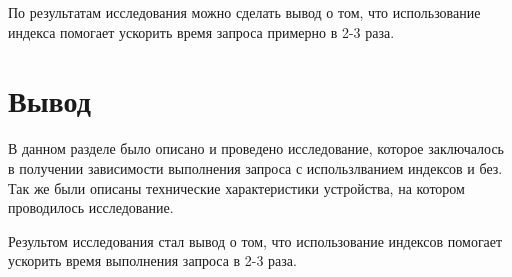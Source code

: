 По результатам исследования можно сделать вывод 
о том, что использование индекса помогает ускорить
время запроса примерно в 2-3 раза.

\section*{Вывод}

В данном разделе было описано и проведено исследование, которое
заключалось в получении зависимости выполнения запроса
с использлванием индексов и без. Так же были описаны технические 
характеристики устройства, на котором проводилось 
исследование. 

Результом исследования стал вывод о том, что использование индексов помогает ускорить
время выполнения запроса в 2-3 раза.

